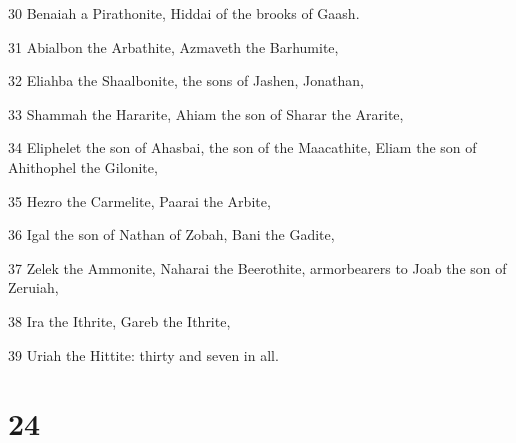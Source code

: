 \par 30 Benaiah a Pirathonite, Hiddai of the brooks of Gaash.
\par 31 Abialbon the Arbathite, Azmaveth the Barhumite,
\par 32 Eliahba the Shaalbonite, the sons of Jashen, Jonathan,
\par 33 Shammah the Hararite, Ahiam the son of Sharar the Ararite,
\par 34 Eliphelet the son of Ahasbai, the son of the Maacathite, Eliam the son of Ahithophel the Gilonite,
\par 35 Hezro the Carmelite, Paarai the Arbite,
\par 36 Igal the son of Nathan of Zobah, Bani the Gadite,
\par 37 Zelek the Ammonite, Naharai the Beerothite, armorbearers to Joab the son of Zeruiah,
\par 38 Ira the Ithrite, Gareb the Ithrite,
\par 39 Uriah the Hittite: thirty and seven in all.

\chapter{24}

